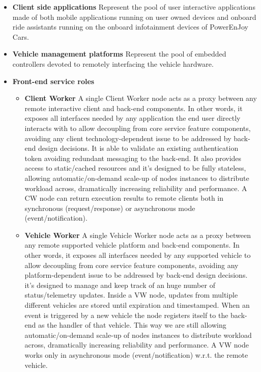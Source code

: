 \begin{itemize}
\item{\textbf{Client side applications}}\newline
Represent the pool of user interactive applications made of both mobile applications running on user owned devices and onboard ride assistants running on the onboard infotainment devices of PowerEnJoy Cars.
\item{\textbf{Vehicle management platforms}}\newline
Represent the pool of embedded controllers devoted to remotely interfacing the vehicle hardware.

\item{\textbf{Front-end service roles}}
\begin{itemize}
\item{\textbf{Client Worker}}\newline
A single Client Worker node acts as a proxy between any remote interactive client and back-end components. In other words, it exposes all interfaces needed by any application the end user directly interacts with to allow decoupling from core service feature components, avoiding any client technology-dependent issue to be addressed by back-end design decisions. It is able to validate an existing authentication token avoiding redundant messaging to the back-end. It also provides access to static/cached resources and it's designed to be fully stateless, allowing automatic/on-demand scale-up of nodes instances to distribute workload across, dramatically increasing reliability and performance. A CW node can return execution results to remote clients both in synchronous (request/response) or asynchronous mode (event/notification).
\item{\textbf{Vehicle Worker}}\newline
A single Vehicle Worker node acts as a proxy between any remote supported vehicle platform and back-end components. In other words, it exposes all interfaces needed by any supported vehicle to allow decoupling from core service feature components, avoiding any platform-dependent issue to be addressed by back-end design decisions. it's designed to manage and keep track of an huge number of status/telemetry updates. Inside a VW node, updates from multiple different vehicles are stored until expiration and timestamped. When an event is triggered by a new vehicle the node registers itself to the back-end as the handler of that vehicle. This way we are still allowing automatic/on-demand scale-up of nodes instances to distribute workload across, dramatically increasing reliability and performance. A VW node works only in asynchronous mode (event/notification) w.r.t. the remote vehicle.

\end{itemize}
\end{itemize}
